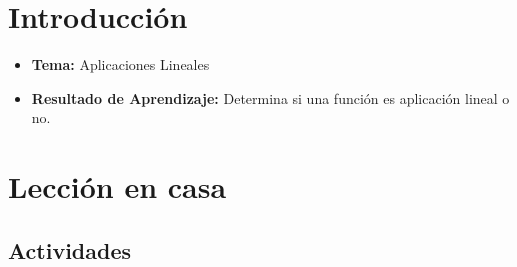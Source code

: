\documentclass[a4,11pt]{aleph-notas}
\begin{document}
\encabezado

\vspace*{-10mm}
\section*{Introducción}

\begin{itemize}
    \item \textbf{Tema:} Aplicaciones Lineales
    \item \textbf{Resultado de Aprendizaje:} Determina si una función es aplicación lineal o no.
\end{itemize}

\section*{Lección en casa}

\subsection*{Actividades}
\end{document}

